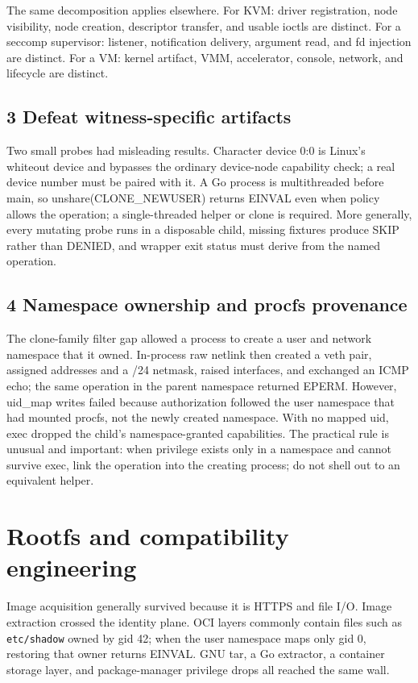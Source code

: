 \documentclass[10pt,twocolumn]{article}
\begin{document}
The same decomposition applies elsewhere. For KVM: driver registration, node visibility, node creation, descriptor transfer, and usable ioctls are distinct. For a seccomp supervisor: listener, notification delivery, argument read, and fd injection are distinct. For a VM: kernel artifact, VMM, accelerator, console, network, and lifecycle are distinct.

\subsection{3 Defeat witness-specific artifacts}
Two small probes had misleading results. Character device 0:0 is Linux's whiteout device and bypasses the ordinary device-node capability check; a real device number must be paired with it. A Go process is multithreaded before main, so unshare(CLONE\_NEWUSER) returns EINVAL even when policy allows the operation; a single-threaded helper or clone is required. More generally, every mutating probe runs in a disposable child, missing fixtures produce SKIP rather than DENIED, and wrapper exit status must derive from the named operation.

\subsection{4 Namespace ownership and procfs provenance}
The clone-family filter gap allowed a process to create a user and network namespace that it owned. In-process raw netlink then created a veth pair, assigned addresses and a /24 netmask, raised interfaces, and exchanged an ICMP echo; the same operation in the parent namespace returned EPERM. However, uid\_map writes failed because authorization followed the user namespace that had mounted procfs, not the newly created namespace. With no mapped uid, exec dropped the child's namespace-granted capabilities. The practical rule is unusual and important: when privilege exists only in a namespace and cannot survive exec, link the operation into the creating process; do not shell out to an equivalent helper.

\section{Rootfs and compatibility engineering}
Image acquisition generally survived because it is HTTPS and file I/O. Image extraction crossed the identity plane. OCI layers commonly contain files such as \texttt{etc/shadow} owned by gid 42; when the user namespace maps only gid 0, restoring that owner returns EINVAL. GNU tar, a Go extractor, a container storage layer, and package-manager privilege drops all reached the same wall.
\end{document}
